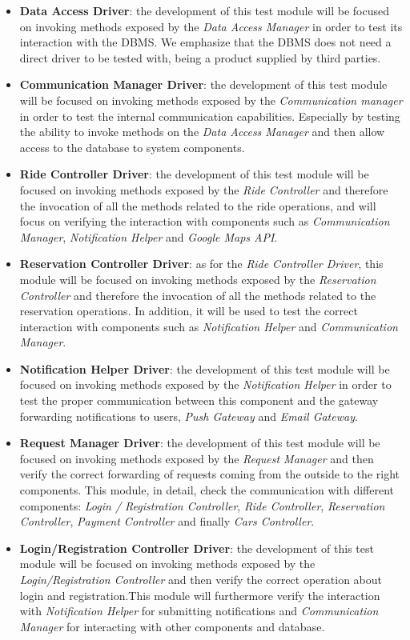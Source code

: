 \documentclass[10pt, a4paper,titlepage]{article}
\begin{document}
\begin{itemize}
\item \textbf{Data Access Driver}: the development of this test module will be focused on invoking methods exposed by the \emph{Data Access Manager} in order to test its interaction with the DBMS. We emphasize that the DBMS does not need a direct driver to be tested with, being a product supplied by third parties.
\item \textbf{Communication Manager Driver}: the development of this test module will be focused on invoking methods exposed by the \emph{Communication manager} in order to test the internal communication capabilities. Especially by testing the ability to invoke methods on the \emph{Data Access Manager} and then allow access to the database to system components.
\item \textbf{Ride Controller Driver}: the development of this test module will be focused on invoking methods exposed by the \emph{Ride Controller} and therefore the invocation of all the methods related to the ride operations, and will focus on verifying the interaction with components such as \emph{Communication Manager}, \emph{Notification Helper} and \emph{Google Maps API}.
\item \textbf{Reservation Controller Driver}: as for the \emph{Ride Controller Driver}, this module will be focused on invoking methods exposed by the \emph{Reservation Controller} and therefore the invocation of all the methods related to the reservation operations. In addition, it will be used to test the correct interaction with components such as \emph{Notification Helper} and \emph{Communication Manager}.
\item \textbf{Notification Helper Driver}: the development of this test module will be focused on invoking methods exposed by the \emph{Notification Helper} in order to test the proper communication between this component and the gateway forwarding notifications to users, \emph{Push Gateway} and \emph{Email Gateway}.
\item \textbf{Request Manager Driver}: the development of this test module will be focused on invoking methods exposed by the \emph{Request Manager} and then verify the correct forwarding of requests coming from the outside to the right components. This module, in detail, check the communication with different components: \emph{Login / Registration Controller}, \emph{Ride Controller}, \emph{Reservation Controller}, \emph{Payment Controller} and finally \emph{Cars Controller}.
\item \textbf{Login/Registration Controller Driver}: the development of this test module will be focused on invoking methods exposed by the \emph{Login/Registration Controller} and then verify the correct operation about login and registration.This module will furthermore verify the interaction with \emph{Notification Helper} for submitting notifications and \emph{Communication Manager} for interacting with other components and database.

\end{itemize}
\end{document}
